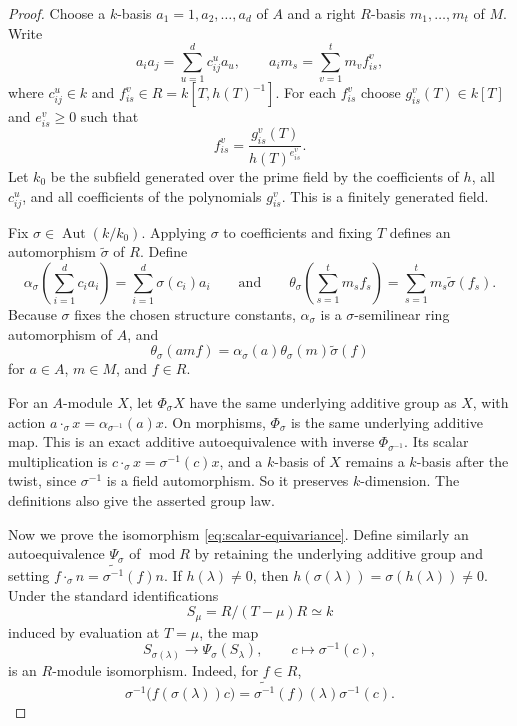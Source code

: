 \documentclass[11pt,letterpaper,reqno]{amsart}
\theoremstyle{definition}
\DeclareMathOperator{\Aut}{Aut}
\newcommand{\modcat}{\operatorname{mod}}
\begin{document}
\begin{proof}
Choose a $k$-basis $a_1=1,a_2,\ldots,a_d$ of $A$ and a right $R$-basis
$m_1,\ldots,m_t$ of $M$.  Write
\[
a_ia_j=\sum_{u=1}^d c_{ij}^u a_u,
\qquad
a_im_s=\sum_{v=1}^t m_v f_{is}^v,
\]
where $c_{ij}^u\in k$ and $f_{is}^v\in R=k[T,h(T)^{-1}]$.  For each $f_{is}^v$ choose
$g_{is}^v(T)\in k[T]$ and $e_{is}^v\geq0$ such that
\[
f_{is}^v=\frac{g_{is}^v(T)}{h(T)^{e_{is}^v}}.
\]
Let $k_0$ be the subfield generated over the prime field by the
coefficients of $h$, all $c_{ij}^u$, and all coefficients of the
polynomials $g_{is}^v$.  This is a finitely generated field.

Fix $\sigma\in\Aut(k/k_0)$.  Applying $\sigma$ to coefficients and fixing
$T$ defines an automorphism $\widetilde\sigma$ of $R$.  Define
\[
\alpha_\sigma\left(\sum_{i=1}^d c_i a_i\right)
 =\sum_{i=1}^d\sigma(c_i)a_i
\qquad
\text{and}
\qquad
\theta_\sigma\left(\sum_{s=1}^t m_s f_s\right)
 =\sum_{s=1}^t m_s\widetilde\sigma(f_s).
\]
Because $\sigma$ fixes the chosen structure constants,
$\alpha_\sigma$ is a $\sigma$-semilinear ring automorphism of $A$, and
\begin{equation}\label{eq:theta-compatibility}
\theta_\sigma(amf)
 =\alpha_\sigma(a)\theta_\sigma(m)\widetilde\sigma(f)
\end{equation}
for $a\in A$, $m\in M$, and $f\in R$.

For an $A$-module $X$, let $\Phi_\sigma X$ have the same underlying
additive group as $X$, with action $a\mathbin{\cdot_\sigma}x=\alpha_{\sigma^{-1}}(a)x$. On morphisms, $\Phi_\sigma$ is the same underlying additive map.  This is an
exact additive autoequivalence with inverse $\Phi_{\sigma^{-1}}$.  Its
scalar multiplication is $c\mathbin{\cdot_\sigma}x=\sigma^{-1}(c)x$, and a $k$-basis of $X$ remains a $k$-basis after the twist, since $\sigma^{-1}$ is a field automorphism. 
So it preserves $k$-dimension.  The definitions also give the asserted
group law.

Now we prove the isomorphism \eqref{eq:scalar-equivariance}.
Define similarly an autoequivalence $\Psi_\sigma$ of $\modcat R$ by
retaining the underlying additive group and setting $f\mathbin{\cdot_\sigma}n=\widetilde{\sigma^{-1}}(f)n$. If $h(\lambda)\neq0$, then
$h(\sigma(\lambda))=\sigma(h(\lambda))\neq0$.
Under the standard identifications
\[
S_\mu=R/(T-\mu)R\simeq k
\]
induced by evaluation at $T=\mu$, the map
\[
S_{\sigma(\lambda)}\longrightarrow\Psi_\sigma(S_\lambda),
\qquad c\longmapsto\sigma^{-1}(c),
\]
is an $R$-module isomorphism.  Indeed, for $f\in R$,
\[
\sigma^{-1}\bigl(f(\sigma(\lambda))c\bigr)
 =\widetilde{\sigma^{-1}}(f)(\lambda)\sigma^{-1}(c).
\]


\end{proof}
\end{document}
